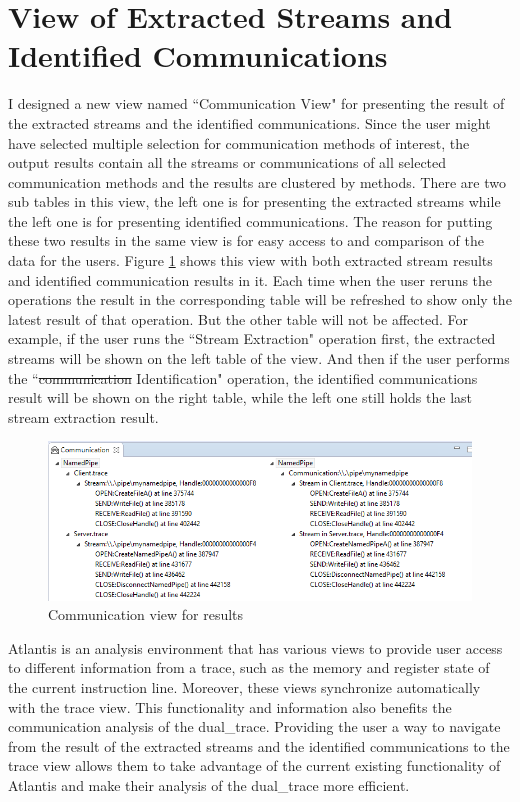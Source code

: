\documentclass[12pt,oneside]{book}
\providecommand{\DIFaddtex}[1]{{\protect\color{blue}\uwave{#1}}} %
\providecommand{\DIFdeltex}[1]{{\protect\color{red}\sout{#1}}}                      %
\providecommand{\DIFaddbegin}{} %
\providecommand{\DIFaddend}{} %
\providecommand{\DIFdelbegin}{} %
\providecommand{\DIFdelend}{} %
\providecommand{\DIFaddbeginFL}{} %
\providecommand{\DIFaddendFL}{} %
\providecommand{\DIFdelbeginFL}{} %
\providecommand{\DIFdelendFL}{} %
\providecommand{\DIFadd}[1]{\texorpdfstring{\DIFaddtex{#1}}{#1}} %
\providecommand{\DIFdel}[1]{\texorpdfstring{\DIFdeltex{#1}}{}} %
\newcommand{\DIFscaledelfig}{0.5}
\newlength{\DIFdelgraphicswidth} %
\newlength{\DIFdelgraphicsheight} %
\newcommand{\DIFaddincludegraphics}[2][]{{\color{blue}\fbox{\DIFOincludegraphics[#1]{#2}}}} %
\newcommand{\DIFdelincludegraphics}[2][]{%
\sbox{\DIFdelgraphicsbox}{\DIFOincludegraphics[#1]{#2}}%
\settoboxwidth{\DIFdelgraphicswidth}{\DIFdelgraphicsbox} %
\settoboxtotalheight{\DIFdelgraphicsheight}{\DIFdelgraphicsbox} %
\scalebox{\DIFscaledelfig}{%
\parbox[b]{\DIFdelgraphicswidth}{\usebox{\DIFdelgraphicsbox}\\[-\baselineskip] \rule{\DIFdelgraphicswidth}{0em}}\llap{\resizebox{\DIFdelgraphicswidth}{\DIFdelgraphicsheight}{%
\setlength{\unitlength}{\DIFdelgraphicswidth}%
\begin{picture}(1,1)%
\thicklines\linethickness{2pt} %
{\color[rgb]{1,0,0}\put(0,0){\framebox(1,1){}}}%
{\color[rgb]{1,0,0}\put(0,0){\line( 1,1){1}}}%
{\color[rgb]{1,0,0}\put(0,1){\line(1,-1){1}}}%
\end{picture}%
}\hspace*{3pt}}} %
} %
\DeclareRobustCommand{\DIFaddbegin}{\DIFOaddbegin \let\includegraphics\DIFaddincludegraphics} %
\DeclareRobustCommand{\DIFaddend}{\DIFOaddend \let\includegraphics\DIFOincludegraphics} %
\DeclareRobustCommand{\DIFdelbegin}{\DIFOdelbegin \let\includegraphics\DIFdelincludegraphics} %
\DeclareRobustCommand{\DIFdelend}{\DIFOaddend \let\includegraphics\DIFOincludegraphics} %
\DeclareRobustCommand{\DIFaddbeginFL}{\DIFOaddbeginFL \let\includegraphics\DIFaddincludegraphics} %
\DeclareRobustCommand{\DIFaddendFL}{\DIFOaddendFL \let\includegraphics\DIFOincludegraphics} %
\DeclareRobustCommand{\DIFdelbeginFL}{\DIFOdelbeginFL \let\includegraphics\DIFdelincludegraphics} %
\DeclareRobustCommand{\DIFdelendFL}{\DIFOaddendFL \let\includegraphics\DIFOincludegraphics} %
\begin{document}
\section{View of Extracted Streams and Identified Communications}
I designed a new view named ``Communication View" for presenting the result of the extracted streams and the identified communications. Since the user might have selected multiple selection for communication methods of interest, the output results contain all the streams or communications of all selected communication methods and the results are clustered by methods. There are two sub tables in this view, the left one is for presenting the extracted streams while the left one is for presenting identified communications. The reason for putting these two results in the same view is for easy access to and comparison of the data for the users. Figure \ref{idenview} shows this view with both extracted stream results and identified communication results in it. Each time when the user reruns the operations the result in the corresponding table will be refreshed to show only the latest result of that operation. But the other table will not be affected. For example, if the user runs the ``Stream Extraction" operation first, the extracted streams will be shown on the left table of the view. And then if the user performs the ``\DIFdelbegin \DIFdel{communication }\DIFdelend \DIFaddbegin \DIFadd{Communication }\DIFaddend Identification" operation, the identified communications result will be shown on the right table, while the left one still holds the last stream extraction result.

\begin{figure}[H]
\DIFdelbeginFL %
\DIFdelendFL \DIFaddbeginFL \centerline{\includegraphics[scale=0.8]{Figures/idenview}}
 \DIFaddendFL \caption{Communication view for results}
\label{idenview}
\end{figure}

Atlantis is an analysis environment that has various views to provide user access to different information from a trace, such as the memory and register state of the current instruction line. Moreover, these views synchronize automatically with the trace view. This functionality and information also benefits the communication analysis of the dual\_trace. Providing the user a way to navigate from the result of the extracted streams and the identified communications to the trace view allows them to take advantage of the current existing functionality of Atlantis and make their analysis of the dual\_trace more efficient.
\end{document}
